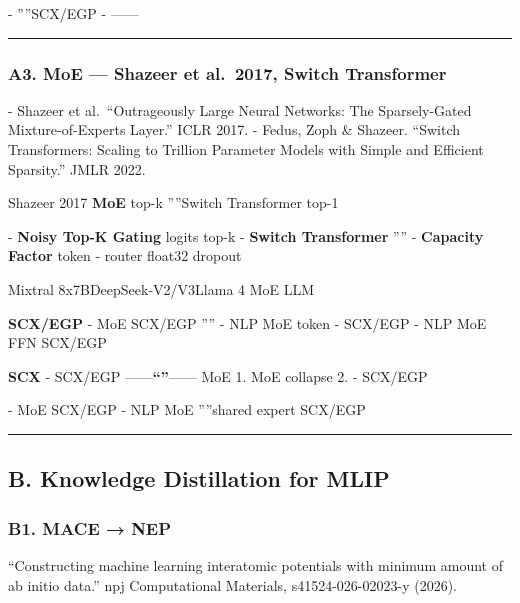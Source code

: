 \documentclass[
  12pt,
]{article}
\begin{document}
\textbf{} -
''''SCX/EGP
\textbf{} -
------

\begin{center}\rule{0.5\linewidth}{0.5pt}\end{center}

\subsubsection{A3.  MoE --- Shazeer et al.~2017, Switch
Transformer}\label{a3.-ux901aux7528-moe-shazeer-et-al.-2017-switch-transformer}

\textbf{} - Shazeer et al.~``Outrageously Large Neural Networks:
The Sparsely-Gated Mixture-of-Experts Layer.'' ICLR 2017. - Fedus, Zoph
\& Shazeer. ``Switch Transformers: Scaling to Trillion Parameter Models
with Simple and Efficient Sparsity.'' JMLR 2022.

\textbf{} Shazeer 2017 \textbf{ MoE
} top-k
''''Switch
Transformer  top-1 

\textbf{} - \textbf{Noisy Top-K Gating}  logits
 top-k - \textbf{Switch
Transformer}
''''
- \textbf{Capacity Factor}  token
 - \textbf{} router 
float32 dropout

\textbf{}  Mixtral 8x7BDeepSeek-V2/V3Llama 4 
MoE LLM

\textbf{ SCX/EGP } - \textbf{} 
MoE SCX/EGP
'''' -
NLP MoE  token - SCX/EGP
 - NLP MoE  FFN
SCX/EGP 

\textbf{SCX } - SCX/EGP
------\textbf{``''}------
MoE  1. \textbf{}  MoE
collapse 2.
\textbf{}  - SCX/EGP


\textbf{} -  MoE
 SCX/EGP
 -  NLP MoE ''''shared expert
SCX/EGP 

\begin{center}\rule{0.5\linewidth}{0.5pt}\end{center}

\subsection{B. Knowledge Distillation for
MLIP}\label{b.-knowledge-distillation-for-mlip}

\subsubsection{B1. MACE → NEP }\label{b1.-mace-nep-ux84b8ux998f}

\textbf{} ``Constructing machine learning interatomic potentials
with minimum amount of ab initio data.'' npj Computational Materials,
s41524-026-02023-y (2026).
\end{document}
